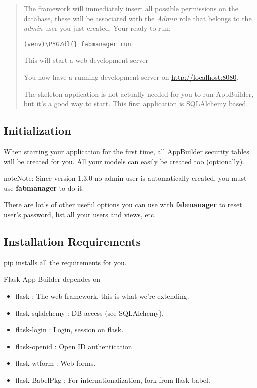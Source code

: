 \documentclass[letterpaper,10pt,english]{sphinxmanual}
\def\PYGZdl{\char`\$}
\begin{document}
\begin{itemize}
\begin{quote}
The framework will immediately insert all possible permissions on the database, these will be associated with
the \emph{Admin} role that belongs to the \emph{admin} user you just created. Your ready to run:

\begin{Verbatim}[commandchars=\\\{\}]
(venv)\PYGZdl{} fabmanager run
\end{Verbatim}

This will start a web development server

You now have a running development server on \url{http://localhost:8080}.

The skeleton application is not actually needed for you to run AppBuilder, but it's a good way to start.
This first application is SQLAlchemy based.
\end{quote}

\end{itemize}


\subsection{Initialization}
\label{installation:initialization}
When starting your application for the first time,
all AppBuilder security tables will be created for you.
All your models can easily be created too (optionally).

\begin{notice}{note}{Note:}
Since version 1.3.0 no admin user is automatically created, you must use \textbf{fabmanager} to do it.
\end{notice}

There are lot's of other useful options you can use with \textbf{fabmanager} to reset user's password,
list all your users and views, etc.


\subsection{Installation Requirements}
\label{installation:installation-requirements}
pip installs all the requirements for you.

Flask App Builder dependes on
\begin{itemize}
\item {} 
flask : The web framework, this is what we're extending.

\item {} 
flask-sqlalchemy : DB access (see SQLAlchemy).

\item {} 
flask-login : Login, session on flask.

\item {} 
flask-openid : Open ID authentication.

\item {} 
flask-wtform : Web forms.

\item {} 
flask-BabelPkg : For internationalization, fork from flask-babel.

\end{itemize}
\end{document}
